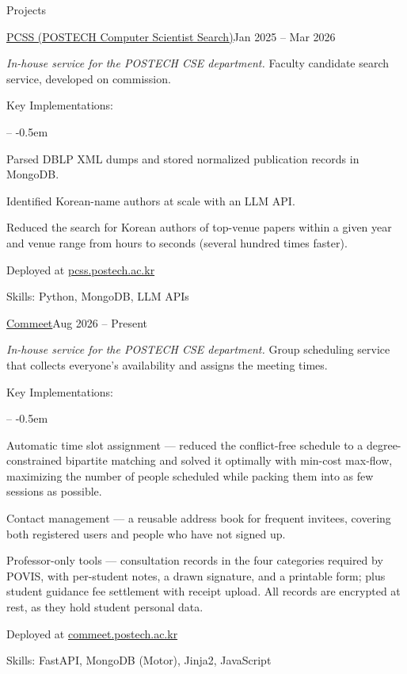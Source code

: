 \documentclass{resume}
\begin{document}
\begin{rSection}{Projects}
	\begin{rSubsection}{\href{https://pcss.postech.ac.kr/}{PCSS (POSTECH Computer Scientist Search)}}{Jan 2025 -- Mar 2026}

		\textit{In-house service for the POSTECH CSE department.} Faculty candidate search service, developed on commission.

		\item Key Implementations:
		\vspace{-0.5em}
		\begin{list}{--}{}
			\itemsep -0.5em
			\item Parsed DBLP XML dumps and stored normalized publication records in MongoDB.
			\item Identified Korean-name authors at scale with an LLM API.
			\item Reduced the search for Korean authors of top-venue papers within a given year and venue range from hours to seconds (several hundred times faster).
		\end{list}
		\item Deployed at \href{https://pcss.postech.ac.kr/}{pcss.postech.ac.kr}
		\item Skills: Python, MongoDB, LLM APIs
	\end{rSubsection}

	\begin{rSubsection}{\href{https://commeet.postech.ac.kr}{Commeet}}{Aug 2026 -- Present}

		\textit{In-house service for the POSTECH CSE department.} Group scheduling service that collects everyone's availability and assigns the meeting times.

		\item Key Implementations:
		\vspace{-0.5em}
		\begin{list}{--}{}
			\itemsep -0.5em
			\item Automatic time slot assignment --- reduced the conflict-free schedule to a degree-constrained bipartite matching and solved it optimally with min-cost max-flow, maximizing the number of people scheduled while packing them into as few sessions as possible.
			\item Contact management --- a reusable address book for frequent invitees, covering both registered users and people who have not signed up.
			\item Professor-only tools --- consultation records in the four categories required by POVIS, with per-student notes, a drawn signature, and a printable form; plus student guidance fee settlement with receipt upload. All records are encrypted at rest, as they hold student personal data.
		\end{list}
		\item Deployed at \href{https://commeet.postech.ac.kr}{commeet.postech.ac.kr}
		\item Skills: FastAPI, MongoDB (Motor), Jinja2, JavaScript
	\end{rSubsection}


\end{rSection}
\end{document}
